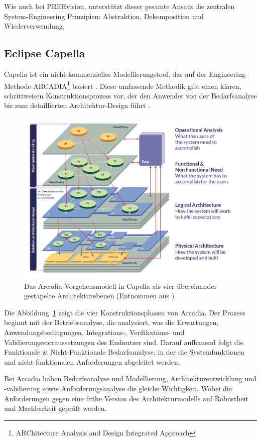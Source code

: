 Wie auch bei PREEvision, unterstützt dieser gesamte Ansatz die zentralen System-Engineering Prinzipien: Abstraktion, Dekomposition und Wiederverwendung\cite{themathworksinc.2025system}.

\subsection{Eclipse Capella}
Capella ist ein nicht-kommerzielles Modellierungstool, das auf der Engineering-Methode ARCADIA\footnote{ARChitecture Analysis and Design Integrated Approach} basiert \cite{roques2016mbse}. Diese umfassende Methodik gibt einen klaren, schrittweisen Konstruktionsprozess vor, der den Anwender von der Bedarfsanalyse bis zum detaillierten Architektur-Design führt \cite{let}.

\begin{figure}[h!]
  \centering
  \includegraphics[width=.7\textwidth]{figures/03StandDerTechnik/phases_arcadia.png}
  \caption{Das Arcadia-Vorgehensmodell in Capella als vier übereinander gestapelte Architekturebenen (Entnommen aus \cite{let})}
  \label{fig:capella_modell}
\end{figure}

Die Abbildung~\ref{fig:capella_modell} zeigt die vier Konstruktionsphasen von Arcadia. Der Prozess beginnt mit der Betriebsanalyse, die analysiert, was die Erwartungen, Anwendungsbedingungen, Integrations-, Verifikations- und Validierungsvorraussetzungen des Endnutzer sind. Darauf aufbauend folgt die Funktionale \& Nicht-Funktionale Bedarfsanalyse, in der die Systemfunktionen und nicht-funktionalen Anforderungen abgeleitet werden.

Bei Arcadia haben Bedarfsanalyse und Modellierung, Architekturentwicklung und -validierung sowie Anforderungsanalyse die gleiche Wichtigkeit. Wobei die Anforderungen gegen eine frühe Version des Architekturmodells auf Robustheit und Machbarkeit geprüft werden.

